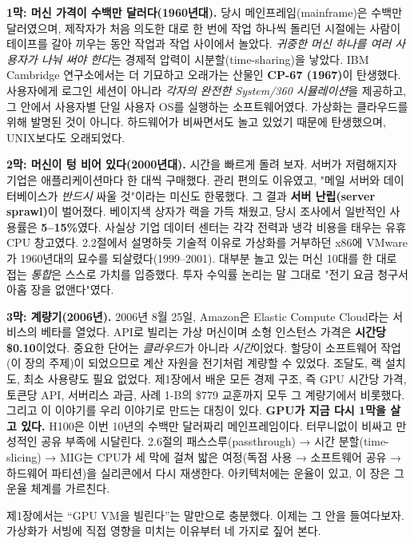 \textbf{1막: 머신 가격이 수백만 달러다(1960년대).} 당시 메인프레임(mainframe)은 수백만 달러였으며, 제작자가 처음 의도한 대로 한 번에 작업 하나씩 돌리던 시절에는 사람이 테이프를 갈아 끼우는 동안 작업과 작업 사이에서 놀았다. \textit{귀중한 머신 하나를 여러 사용자가 나눠 써야 한다}는 경제적 압력이 시분할(time-sharing)을 낳았다. IBM Cambridge 연구소에서는 더 기묘하고 오래가는 산물인 \textbf{CP-67 (1967)}이 탄생했다. 사용자에게 로그인 세션이 아니라 \textit{각자의 완전한 System/360 시뮬레이션}을 제공하고, 그 안에서 사용자별 단일 사용자 OS를 실행하는 소프트웨어였다. 가상화는 클라우드를 위해 발명된 것이 아니다. 하드웨어가 비싸면서도 놀고 있었기 때문에 탄생했으며, UNIX보다도 오래되었다.

\textbf{2막: 머신이 텅 비어 있다(2000년대).} 시간을 빠르게 돌려 보자. 서버가 저렴해지자 기업은 애플리케이션마다 한 대씩 구매했다. 관리 편의도 이유였고, "메일 서버와 데이터베이스가 \textit{반드시} 싸울 것"이라는 미신도 한몫했다. 그 결과 \textbf{서버 난립(server sprawl)}이 벌어졌다. 베이지색 상자가 랙을 가득 채웠고, 당시 조사에서 일반적인 사용률은 \textbf{5–15\%}였다. 사실상 기업 데이터 센터는 각각 전력과 냉각 비용을 태우는 유휴 CPU 창고였다. 2.2절에서 설명하듯 기술적 이유로 가상화를 거부하던 x86에 VMware가 1960년대의 묘수를 되살렸다(1999–2001). 대부분 놀고 있는 머신 10대를 한 대로 접는 \textit{통합}은 스스로 가치를 입증했다. 투자 수익률 논리는 말 그대로 "전기 요금 청구서 아홉 장을 없앤다"였다.

\textbf{3막: 계량기(2006년).} 2006년 8월 25일, Amazon은 Elastic Compute Cloud라는 서비스의 베타를 열었다. API로 빌리는 가상 머신이며 소형 인스턴스 가격은 \textbf{시간당 \$0.10}이었다. 중요한 단어는 \textit{클라우드}가 아니라 \textit{시간}이었다. 할당이 소프트웨어 작업(이 장의 주제)이 되었으므로 계산 자원을 전기처럼 계량할 수 있었다. 조달도, 랙 설치도, 최소 사용량도 필요 없었다. 제1장에서 배운 모든 경제 구조, 즉 GPU 시간당 가격, 토큰당 API, 서버리스 과금, 사례 1-B의 \$779 교훈까지 모두 그 계량기에서 비롯했다. 그리고 이 이야기를 우리 이야기로 만드는 대칭이 있다. \textbf{GPU가 지금 다시 1막을 살고 있다.} H100은 이번 10년의 수백만 달러짜리 메인프레임이다. 터무니없이 비싸고 만성적인 공유 부족에 시달린다. 2.6절의 패스스루(passthrough) → 시간 분할(time-slicing) → MIG는 CPU가 세 막에 걸쳐 밟은 여정(독점 사용 → 소프트웨어 공유 → 하드웨어 파티션)을 실리콘에서 다시 재생한다. 아키텍처에는 운율이 있고, 이 장은 그 운율 체계를 가르친다.

제1장에서는 “GPU VM을 빌린다”는 말만으로 충분했다. 이제는 그 안을 들여다보자. 가상화가 서빙에 직접 영향을 미치는 이유부터 네 가지로 짚어 본다.


